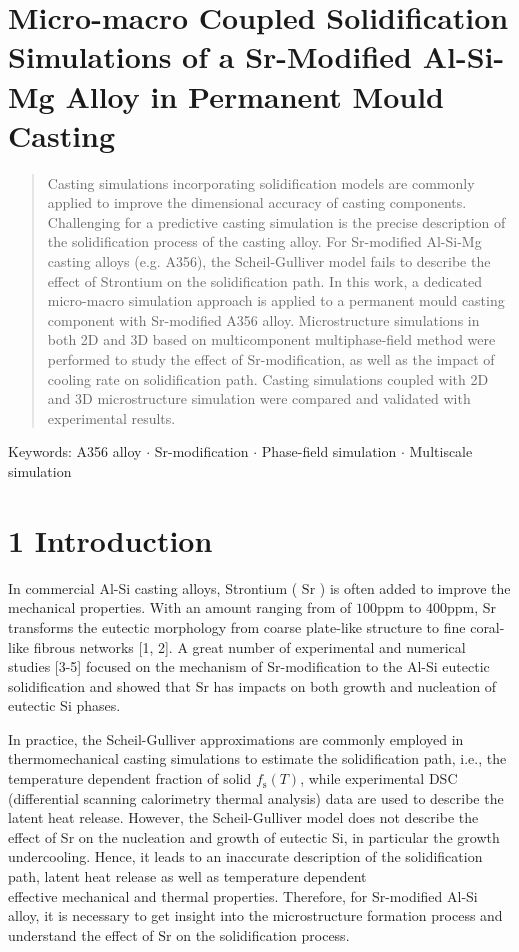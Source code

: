 \documentclass[10pt]{article}
\begin{document}
\section*{Micro-macro Coupled Solidification Simulations of a Sr-Modified Al-Si-Mg Alloy in Permanent Mould Casting }


\begin{abstract}
Casting simulations incorporating solidification models are commonly applied to improve the dimensional accuracy of casting components. Challenging for a predictive casting simulation is the precise description of the solidification process of the casting alloy. For Sr-modified Al-Si-Mg casting alloys (e.g. A356), the Scheil-Gulliver model fails to describe the effect of Strontium on the solidification path. In this work, a dedicated micro-macro simulation approach is applied to a permanent mould casting component with Sr-modified A356 alloy. Microstructure simulations in both 2D and 3D based on multicomponent multiphase-field method were performed to study the effect of $\mathrm{Sr}$-modification, as well as the impact of cooling rate on solidification path. Casting simulations coupled with 2D and 3D microstructure simulation were compared and validated with experimental results.
\end{abstract}

Keywords: A356 alloy $\cdot$ Sr-modification $\cdot$ Phase-field simulation $\cdot$ Multiscale simulation

\section*{1 Introduction}
In commercial Al-Si casting alloys, Strontium ( $\mathrm{Sr}$ ) is often added to improve the mechanical properties. With an amount ranging from of $100 \mathrm{ppm}$ to $400 \mathrm{ppm}$, Sr transforms the eutectic morphology from coarse plate-like structure to fine coral-like fibrous networks [1, 2]. A great number of experimental and numerical studies [3-5] focused on the mechanism of Sr-modification to the Al-Si eutectic solidification and showed that $\mathrm{Sr}$ has impacts on both growth and nucleation of eutectic Si phases.

In practice, the Scheil-Gulliver approximations are commonly employed in thermomechanical casting simulations to estimate the solidification path, i.e., the temperature dependent fraction of solid $f_{\mathrm{s}}(T)$, while experimental DSC (differential scanning calorimetry thermal analysis) data are used to describe the latent heat release. However, the Scheil-Gulliver model does not describe the effect of Sr on the nucleation and growth of eutectic Si, in particular the growth undercooling. Hence, it leads to an inaccurate description of the solidification path, latent heat release as well as temperature dependent\\
effective mechanical and thermal properties. Therefore, for Sr-modified Al-Si alloy, it is necessary to get insight into the microstructure formation process and understand the effect of $\mathrm{Sr}$ on the solidification process.
\end{document}
